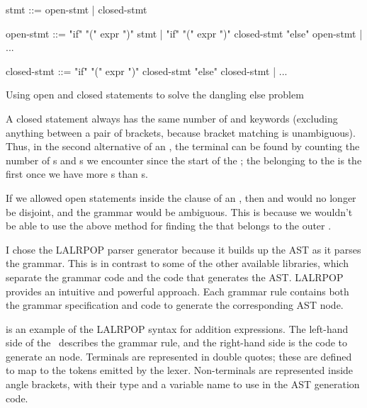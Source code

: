 \documentclass[00-main.tex]{subfiles}
\begin{document}
\begin{listing}[!ht]
  \begin{GrammarListing}
    stmt        ::= open-stmt | closed-stmt

    open-stmt   ::= "if" "(" expr ")" stmt
                  | "if" "(" expr ")" closed-stmt "else" open-stmt
                  | ...

    closed-stmt ::= "if" "(" expr ")" closed-stmt "else" closed-stmt
                  | ...
  \end{GrammarListing}
  \caption{Using open and closed statements to solve the dangling else problem}
  \label{lst:open/closed statement grammar}
\end{listing}

A closed statement always has the same number of  and  keywords (excluding anything between a pair of brackets, because bracket matching is unambiguous).
Thus, in the second alternative of an , the  terminal can be found by counting the number of s and s we encounter since the start of the ; the  belonging to the  is the first  once we have more s than s.

If we allowed open statements inside the  clause of an , then  and  would no longer be disjoint, and the grammar would be ambiguous. This is because we wouldn't be able to use the above method for finding the  that belongs to the outer .

I chose the LALRPOP parser generator because it builds up the AST as it parses the grammar.
This is in contrast to some of the other available libraries, which separate the grammar code and the code that generates the AST\@.
LALRPOP provides an intuitive and powerful approach.
Each grammar rule contains both the grammar specification and code to generate the corresponding AST node.

 is an example of the LALRPOP syntax for addition expressions.
The left-hand side of the~\RustInline{=>} describes the grammar rule, and the right-hand side is the code to generate an  node.
Terminals are represented in double quotes; these are defined to map to the tokens emitted by the lexer.
Non-terminals are represented inside angle brackets, with their type and a variable name to use in the AST generation code.
\end{document}
